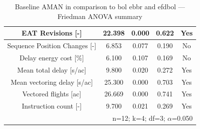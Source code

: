 \begin{table}[htbp]
\caption{Baseline AMAN in comparison to bol ebbr and efdbol — Friedman ANOVA summary}
\begin{center}
\footnotesize
\setlength{\tabcolsep}{3pt}
\renewcommand{\arraystretch}{1.000}
\begin{tabular}{|c|c|c|c|c|}
\hline
EAT Revisions [-] & 22.398 & 0.000 & 0.622 & Yes \\
\hline
Sequence Position Changes [-] & 6.853 & 0.077 & 0.190 & No \\
\hline
Delay energy cost [\%] & 6.100 & 0.107 & 0.169 & No \\
\hline
Mean total delay [s/ac] & 9.800 & 0.020 & 0.272 & Yes \\
\hline
Mean vectoring delay [s/ac] & 25.300 & 0.000 & 0.703 & Yes \\
\hline
Vectored flights [ac] & 26.669 & 0.000 & 0.741 & Yes \\
\hline
Instruction count [-] & 9.700 & 0.021 & 0.269 & Yes \\
\hline
\multicolumn{5}{r}{n=12; k=4; df=3; $\alpha$=0.050}\\
\end{tabular}
\label{tab:baseline\_aman\_in\_comparison\_to\_bol\_ebbr\_and\_efdbol\_friedman}
\end{center}
\end{table}